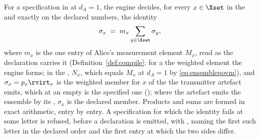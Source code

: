 \begin{requirement}\label{req:da1-source-identity}
For a specification in  at $d_A=1$, the engine
decides, for every $x\in\Xset$ in the  and exactly on the
declared numbers, the identity
\begin{equation*}
  \sigma_x \;=\; m_x\sum_{y\in\Xset}\sigma_y ,
\end{equation*}
where $m_x$ is the one entry of Alice's measurement element $M_x$, read as the
declaration carries it (Definition~\ref{def:compile}: for a
 the weighted element the engine forms; in the
, $N_x$, which equals $M_x$ at $d_A=1$ by
\eqref{eq:ensemblepovm}), and $\sigma_x=p_x\rvirt_x$ is the weighted member
for $x$ of the  the transmitter artefact emits, which
at an empty  is the specified one
(); where the artefact emits the
ensemble by its , $\sigma_x$ is the declared member. Products
and sums are formed in exact arithmetic, entry by entry. A specification for
which the identity fails at some letter is refused, before a declaration is
emitted, with , naming the first such letter
in the declared order and the first entry at which the two sides differ.
\end{requirement}
